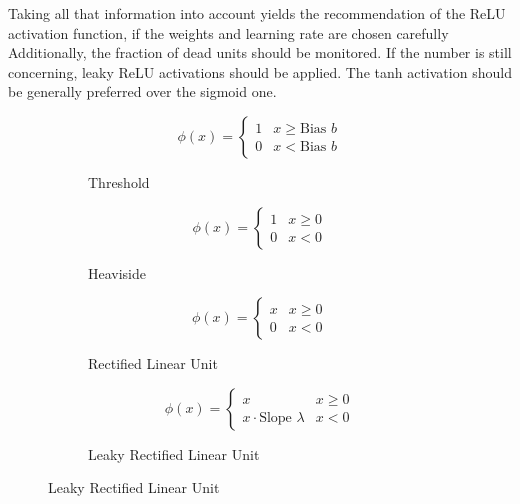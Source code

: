 Taking all that information into account yields the recommendation of the ReLU activation function, if the weights and learning rate are chosen carefully
Additionally, the fraction of dead units should be monitored.
If the number is still concerning, leaky ReLU activations should be applied.
The tanh activation should be generally preferred over the sigmoid one.

\begin{figure}
	\setlength{}
	\setlength{}
	\centering
	\begin{subfigure}{.5\textwidth}
		\centering
		
		\begin{equation*}
		\phi(x) =
		\begin{cases}
		1 & x \geq \text{Bias $b$} \\
		0 & x < \text{Bias $b$}
		\end{cases}
		\end{equation*}
		\caption{Threshold}
		\label{fig:threshold-activation}
	\end{subfigure}%
	\hfill
	\begin{subfigure}{.5\textwidth}
		\centering
		
		\begin{equation*}
		\phi(x) =
		\begin{cases}
		1 & x \geq 0 \\
		0 & x < 0
		\end{cases}
		\end{equation*}
		\caption{Heaviside}
		\label{fig:heaviside-activation}
	\end{subfigure}
	
	\begin{subfigure}{.5\textwidth}
		\centering
		
		\begin{equation*}
		\phi(x) =
		\begin{cases}
		x & x \geq 0 \\
		0 & x < 0
		\end{cases}
		\end{equation*}
		\caption{Rectified Linear Unit}
		\label{fig:relu-activation}
	\end{subfigure}%
	\hfill
	\begin{subfigure}{.5\textwidth}
		\centering
		
		\begin{equation*}
		\phi(x) =
		\begin{cases}
		x & x \geq 0 \\
		x\cdot \text{Slope $\lambda$} & x < 0
		\end{cases}
		\end{equation*}
		\caption{Leaky Rectified Linear Unit}
		\label{fig:leakyrelu-activation}
	\end{subfigure}
	

\end{figure}
